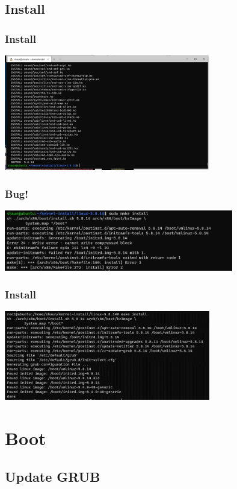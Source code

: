 \documentclass[aspectratio=169]{beamer}
\begin{document}
\subsection{Install}

\begin{frame}
  \frametitle{Install}
  
  \includegraphics[width=9cm]{modules-install.jpg}
\end{frame}

\begin{frame}
  \frametitle{Bug!}
  \includegraphics[width=10cm]{install-bug.jpg}
  
\end{frame}

\begin{frame}
  \frametitle{Install}
  \includegraphics[width=9cm]{install.jpg}
\end{frame}

\section{Boot}

\subsection{Update GRUB}
\end{document}
